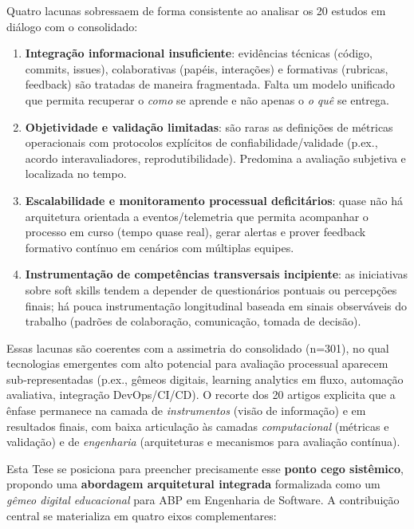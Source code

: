 \documentclass[12pt,a4paper]{article}
\begin{document}
Quatro lacunas sobressaem de forma consistente ao analisar os 20 estudos em diálogo com o consolidado:

\begin{enumerate}
  \item \textbf{Integração informacional insuficiente}: evidências técnicas (código, commits, issues), colaborativas (papéis, interações) e formativas (rubricas, feedback) são tratadas de maneira fragmentada. Falta um modelo unificado que permita recuperar o \emph{como} se aprende e não apenas o \emph{o quê} se entrega.
  \item \textbf{Objetividade e validação limitadas}: são raras as definições de métricas operacionais com protocolos explícitos de confiabilidade/validade (p.ex., acordo interavaliadores, reprodutibilidade). Predomina a avaliação subjetiva e localizada no tempo.
  \item \textbf{Escalabilidade e monitoramento processual deficitários}: quase não há arquitetura orientada a eventos/telemetria que permita acompanhar o processo em curso (tempo quase real), gerar alertas e prover feedback formativo contínuo em cenários com múltiplas equipes.
  \item \textbf{Instrumentação de competências transversais incipiente}: as iniciativas sobre soft skills tendem a depender de questionários pontuais ou percepções finais; há pouca instrumentação longitudinal baseada em sinais observáveis do trabalho (padrões de colaboração, comunicação, tomada de decisão).
\end{enumerate}

Essas lacunas são coerentes com a assimetria do consolidado (n=301), no qual tecnologias emergentes com alto potencial para avaliação processual aparecem sub‑representadas (p.ex., gêmeos digitais, learning analytics em fluxo, automação avaliativa, integração DevOps/CI/CD). O recorte dos 20 artigos explicita que a ênfase permanece na camada de \emph{instrumentos} (visão de informação) e em resultados finais, com baixa articulação às camadas \emph{computacional} (métricas e validação) e de \emph{engenharia} (arquiteturas e mecanismos para avaliação contínua).

Esta Tese se posiciona para preencher precisamente esse \textbf{ponto cego sistêmico}, propondo uma \textbf{abordagem arquitetural integrada} formalizada como um \emph{gêmeo digital educacional} para ABP em Engenharia de Software. A contribuição central se materializa em quatro eixos complementares:
\end{document}
